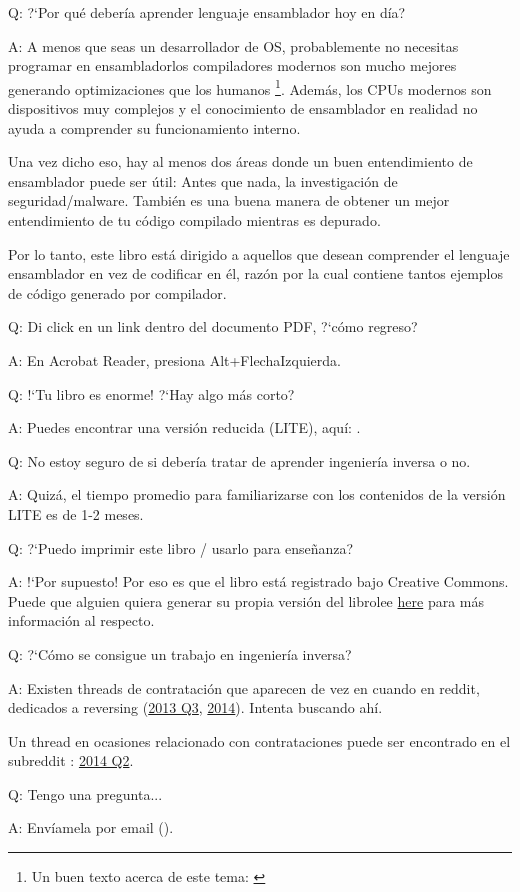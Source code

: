 \par Q: ?`Por qu\'e deber\'ia aprender lenguaje ensamblador hoy en d\'ia?
\par A: A menos que seas un desarrollador de \ac{OS}, probablemente no necesitas programar en ensamblador\textemdash{}los compiladores modernos
son mucho mejores generando optimizaciones que los humanos
\footnote{Un buen texto acerca de este tema: \cite{AgnerFog}}.
Adem\'as, los \ac{CPU}s modernos son dispositivos muy complejos y el conocimiento de ensamblador en realidad no ayuda a comprender su funcionamiento interno.

Una vez dicho eso, hay al menos dos \'areas donde un buen entendimiento de ensamblador puede ser \'util:
Antes que nada, la investigaci\'on de seguridad/malware. Tambi\'en es una buena manera de obtener un mejor entendimiento de tu c\'odigo compilado mientras es depurado.

Por lo tanto, este libro est\'a dirigido a aquellos que desean comprender el lenguaje ensamblador en vez de codificar en \'el,
raz\'on por la cual contiene tantos ejemplos de c\'odigo generado por compilador.

\par Q: Di click en un link dentro del documento PDF, ?`c\'omo regreso?
\par A: En Acrobat Reader, presiona Alt+FlechaIzquierda.

\ifx\LITE\undefined
\par Q: !`Tu libro es enorme! ?`Hay algo m\'as corto?
\par A: Puedes encontrar una versi\'on reducida (LITE), aqu\'i: \LITEURL{}.
\fi

\par Q: No estoy seguro de si deber\'ia tratar de aprender ingenier\'ia inversa o no.
\par A: Quiz\'a, el tiempo promedio para familiarizarse con los contenidos de la versi\'on LITE es de 1-2 meses.

\par Q: ?`Puedo imprimir este libro / usarlo para ense\~nanza?
\par A: !`Por supuesto! Por eso es que el libro est\'a registrado bajo Creative Commons.
Puede que alguien quiera generar su propia versi\'on del libro\textemdash{}lee \href{\HACKINGMdURL}{here} para m\'as informaci\'on al respecto.

\par Q: ?`C\'omo se consigue un trabajo en ingenier\'ia inversa?
\par A: Existen threads de contrataci\'on que aparecen de vez en cuando en reddit, dedicados a reversing\FNURLREDDIT{}
(\href{http://go.yurichev.com/17333}{2013 Q3}, 
\href{http://go.yurichev.com/17334}{2014}).
Intenta buscando ah\'i.

Un thread en ocasiones relacionado con contrataciones puede ser encontrado en el subreddit :
\href{http://go.yurichev.com/17335}{2014 Q2}.

\par Q: Tengo una pregunta...
\par A: Env\'iamela por email (\EMAIL).

\fi %

